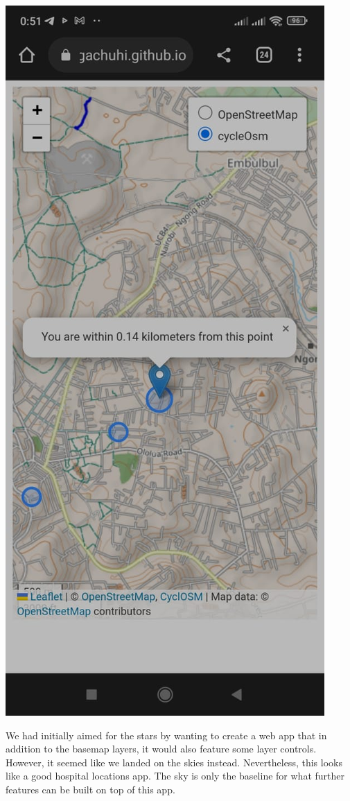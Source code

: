 \documentclass[
]{book}
\begin{document}
\includegraphics{../images/mobile-app.jpg}

We had initially aimed for the stars by wanting to create a web app that in addition to the basemap layers, it would also feature some layer controls. However, it seemed like we landed on the skies instead. Nevertheless, this looks like a good hospital locations app. The sky is only the baseline for what further features can be built on top of this app.
\end{document}
